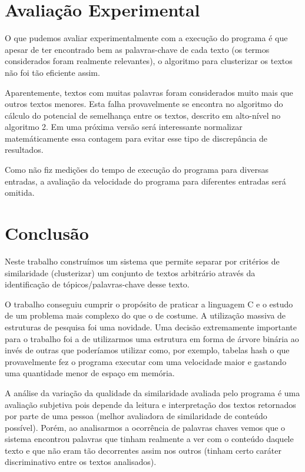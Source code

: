 \documentclass[12pt]{article}
\begin{document}
\section{Avaliação Experimental}
\label{avaliacao_experimental}

O que pudemos avaliar experimentalmente com a execução do programa é que apesar de ter 
encontrado bem as palavras-chave de cada texto (os termos considerados foram realmente 
relevantes), o algoritmo para clusterizar os textos não foi tão eficiente assim.

Aparentemente, textos com muitas palavras foram considerados muito mais que outros textos 
menores. Esta falha provavelmente se encontra no algoritmo do cálculo do potencial de 
semelhança entre os textos, descrito em alto-nível no algoritmo 2. Em uma próxima versão 
será interessante normalizar matemáticamente essa contagem para evitar esse tipo de 
discrepância de resultados.

Como não fiz medições do tempo de execução do programa para diversas entradas, a avaliação
da velocidade do programa para diferentes entradas será omitida.

\section{Conclusão}
\label{conclusao}

Neste trabalho construímos um sistema que permite separar por critérios de similaridade
(clusterizar) um conjunto de textos arbitrário através da identificação de 
tópicos/palavras-chave desse texto.

O trabalho conseguiu cumprir o propósito de praticar a linguagem C e o estudo de um 
problema mais complexo do que o de costume. A utilização massiva de estruturas de pesquisa
foi uma novidade. Uma decisão extremamente importante para o trabalho foi a de utilizarmos 
uma estrutura em forma de árvore binária ao invés de outras que poderíamos utilizar como,
por exemplo, tabelas hash o que provavelmente fez o programa executar com uma velocidade 
maior e gastando uma quantidade menor de espaço em memória.

A análise da variação da qualidade da similaridade avaliada pelo programa é uma avaliação 
subjetiva pois depende da leitura e interpretação dos textos retornados por parte de uma
pessoa (melhor avaliadora de similaridade de conteúdo possível). Porém, ao analisarmos a 
ocorrência de palavras chaves vemos que o sistema encontrou palavras que tinham realmente 
a ver com o conteúdo daquele texto e que não eram tão decorrentes assim nos outros (tinham 
certo caráter discriminativo entre os textos analisados).
\end{document}
